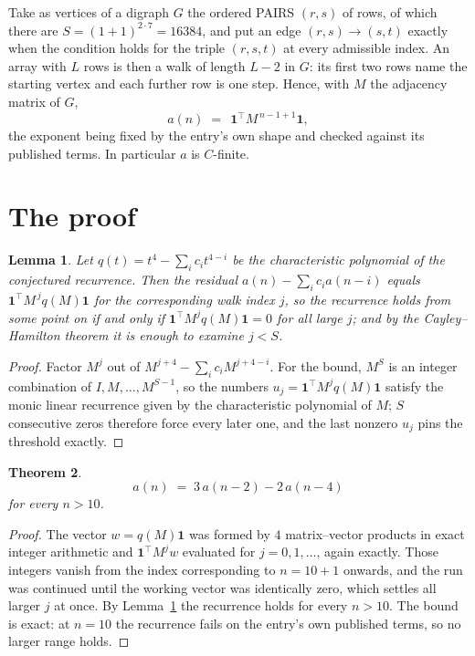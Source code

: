\documentclass[11pt,a4paper]{article}
\theoremstyle{plain}
\newtheorem{theorem}{Theorem}
\newtheorem{lemma}[theorem]{Lemma}
\theoremstyle{definition}
\begin{document}
Take as vertices of a digraph $G$ the ordered PAIRS $(r,s)$ of rows, of which there are
$S=(1+1)^{2\cdot7}=16384$, and put an edge $(r,s)\to(s,t)$ exactly when the condition
holds for the triple $(r,s,t)$ at every admissible index. An array with $L$ rows is then a
walk of length $L-2$ in $G$: its first two rows name the starting vertex and each further
row is one step. Hence, with $M$ the adjacency matrix of $G$,
\[
a(n)\;=\;\,\mathbf{1}^{\!\top}M^{\,n-1+1}\mathbf{1},
\]
the exponent being fixed by the entry's own shape and checked against its published terms.
In particular $a$ is $C$-finite.

\section{The proof}

\begin{lemma}\label{lem:crit}
Let $q(t)=t^{4}-\sum_i c_it^{4-i}$ be the characteristic polynomial of the
conjectured recurrence. Then the residual $a(n)-\sum_ic_ia(n-i)$ equals
$\mathbf{1}^{\!\top}M^{\,j}q(M)\mathbf{1}$ for the corresponding walk index
$j$, so the recurrence holds from some point on if and only if
$\mathbf{1}^{\!\top}M^{j}q(M)\mathbf{1}=0$ for all large $j$; and by the
Cayley--Hamilton theorem it is enough to examine $j<S$.
\end{lemma}

\begin{proof}
Factor $M^{j}$ out of $M^{j+4}-\sum_ic_iM^{j+4-i}$. For the bound, $M^{S}$
is an integer combination of $I,M,\dots,M^{S-1}$, so the numbers
$u_j=\mathbf{1}^{\!\top}M^{j}q(M)\mathbf{1}$ satisfy the monic linear recurrence given by
the characteristic polynomial of $M$; $S$ consecutive zeros therefore force every later one,
and the last nonzero $u_j$ pins the threshold exactly.
\end{proof}

\begin{theorem}
\[
a(n)\;=\;3\,a(n-2) - 2\,a(n-4)
\]
for every $n>10$.
\end{theorem}

\begin{proof}
The vector $w=q(M)\mathbf{1}$ was formed by $4$ matrix--vector products in exact
integer arithmetic and $\mathbf{1}^{\!\top}M^{j}w$ evaluated for $j=0,1,\dots$, again
exactly. Those integers vanish from the index corresponding to $n=10+1$ onwards, and the
run was continued until the working vector was identically zero, which settles all larger $j$
at once. By Lemma~\ref{lem:crit} the recurrence holds for every $n>10$. The bound is exact: at $n=10$ the recurrence fails on the entry's own published terms, so no larger range holds.
\end{proof}
\end{document}
